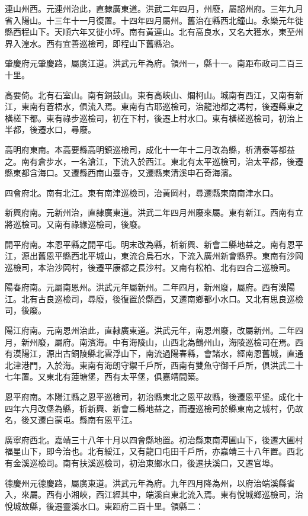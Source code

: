 連山州西。元連州治此，直隸廣東道。洪武二年四月，州廢，屬韶州府。三年九月省入陽山。十三年十一月復置。十四年四月屬州。舊治在縣西北鐘山。永樂元年徙縣西程山下。天順六年又徙小坪。南有黃連山。北有高良水，又名大獲水，東至州界入湟水。西有宜善巡檢司，即程山下舊縣治。

肇慶府元肇慶路，屬廣江道。洪武元年為府。領州一，縣十一。南距布政司二百三十里。

高要倚。北有石室山。南有銅鼓山。東有高峽山、爛柯山。城南有西江，又南有新江，東南有蒼梧水，俱流入焉。東南有古耶巡檢司，治龍池都之馮村，後遷縣東之橫槎下都。東有祿步巡檢司，初在下村，後遷上村水口。東有橫槎巡檢司，初治上半都，後遷水口，尋廢。

高明府東南。本高要縣高明鎮巡檢司，成化十一年十二月改為縣，析清泰等都益之。南有倉步水，一名滄江，下流入於西江。東北有太平巡檢司，治太平都，後遷縣東都含海口。又遷縣西南山臺寺，又遷縣東清溪申石奇海濱。

四會府北。南有北江。東有南津巡檢司，治黃岡村，尋遷縣東南南津水口。

新興府南。元新州治，直隸廣東道。洪武二年四月州廢來屬。東有新江。西南有立將巡檢司。又南有祿緣巡檢司，後廢。

開平府南。本恩平縣之開平屯。明末改為縣，析新興、新會二縣地益之。南有恩平江，源出舊恩平縣西北平城山，東流合烏石水，下流入廣州新會縣界。東南有沙岡巡檢司，本治沙岡村，後遷平康都之長沙村。又南有松柏、北有四合二巡檢司。

陽春府南。元屬南恩州。洪武元年屬新州。二年四月，新州廢，屬府。西有漠陽江。北有古良巡檢司，尋廢，後復置於縣西，又遷南鄉都小水口。又北有思良巡檢司，後廢。

陽江府南。元南恩州治此，直隸廣東道。洪武元年，南恩州廢，改屬新州。二年四月，新州廢，屬府。南濱海。中有海陵山，山西北為鶴州山，海陵巡檢司在焉。西有漠陽江，源出古銅陵縣北雲浮山下，南流過陽春縣，會諸水，經南恩舊城，直通北津港門，入於海。東南有海朗守禦千戶所，西南有雙魚守御千戶所，俱洪武二十七年置。又東北有蓮塘堡，西有太平堡，俱嘉靖間築。

恩平府南。本陽江縣之恩平巡檢司，初治縣東北之恩平故縣，後遷恩平堡。成化十四年六月改堡為縣，析新興、新會二縣地益之，而遷巡檢司於縣東南之城村，仍故名，後又遷白蒙屯。縣南有恩平江。

廣寧府西北。嘉靖三十八年十月以四會縣地置。初治縣東南潭圃山下，後遷大圃村福星山下，即今治也。北有綏江，又有龍口屯田千戶所，亦嘉靖三十八年置。西北有金溪巡檢司。南有扶溪巡檢司，初治東鄉水口，後遷扶溪口，又遷官埠。

德慶州元德慶路，屬廣東道。洪武元年為府。九年四月降為州，以府治端溪縣省入，來屬。西有小湘峽，西江經其中，端溪自東北流入焉。東有悅城鄉巡檢司，治悅城故縣，後遷靈溪水口。東距府二百十里。領縣二：

